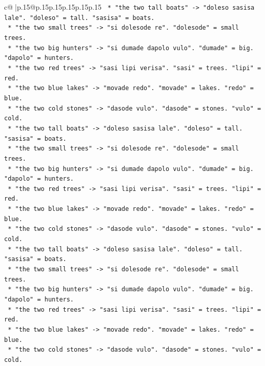 \documentclass{article}
\begin{document}
{\begin{supertabular}{c@{$\;$}|p{.15\linewidth}@{}p{.15\linewidth}p{.15\linewidth}p{.15\linewidth}p{.15\linewidth}p{.15\linewidth}}
{{{\texttt{            *   "the two tall boats" {-}> "doleso sasisa lale". "doleso" = tall. "sasisa" = boats.} \\
\texttt{            *   "the two small trees" {-}> "si dolesode re". "dolesode" = small trees.} \\
\texttt{            *   "the two big hunters" {-}> "si dumade dapolo vulo". "dumade" = big. "dapolo" = hunters.} \\
\texttt{            *   "the two red trees" {-}> "sasi lipi verisa". "sasi" = trees. "lipi" = red.} \\
\texttt{            *   "the two blue lakes" {-}> "movade redo". "movade" = lakes. "redo" = blue.} \\
\texttt{            *   "the two cold stones" {-}> "dasode vulo". "dasode" = stones. "vulo" = cold.} \\
\texttt{            *   "the two tall boats" {-}> "doleso sasisa lale". "doleso" = tall. "sasisa" = boats.} \\
\texttt{            *   "the two small trees" {-}> "si dolesode re". "dolesode" = small trees.} \\
\texttt{            *   "the two big hunters" {-}> "si dumade dapolo vulo". "dumade" = big. "dapolo" = hunters.} \\
\texttt{            *   "the two red trees" {-}> "sasi lipi verisa". "sasi" = trees. "lipi" = red.} \\
\texttt{            *   "the two blue lakes" {-}> "movade redo". "movade" = lakes. "redo" = blue.} \\
\texttt{            *   "the two cold stones" {-}> "dasode vulo". "dasode" = stones. "vulo" = cold.} \\
\texttt{            *   "the two tall boats" {-}> "doleso sasisa lale". "doleso" = tall. "sasisa" = boats.} \\
\texttt{            *   "the two small trees" {-}> "si dolesode re". "dolesode" = small trees.} \\
\texttt{            *   "the two big hunters" {-}> "si dumade dapolo vulo". "dumade" = big. "dapolo" = hunters.} \\
\texttt{            *   "the two red trees" {-}> "sasi lipi verisa". "sasi" = trees. "lipi" = red.} \\
\texttt{            *   "the two blue lakes" {-}> "movade redo". "movade" = lakes. "redo" = blue.} \\
\texttt{            *   "the two cold stones" {-}> "dasode vulo". "dasode" = stones. "vulo" = cold.} \\
}}}
\end{supertabular}}
\end{document}
